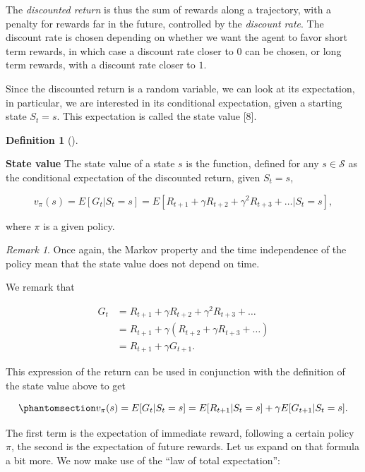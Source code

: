 \documentclass[
  letterpaper,
]{report}
\theoremstyle{definition}
\newtheorem{definition}{Definition}[chapter]
\theoremstyle{plain}
\theoremstyle{definition}
\theoremstyle{remark}
\newtheorem*{remark}{Remark}
\begin{document}
The \emph{discounted return} is thus the sum of rewards along a
trajectory, with a penalty for rewards far in the future, controlled by
the \emph{discount rate}. The discount rate is chosen depending on
whether we want the agent to favor short term rewards, in which case a
discount rate closer to \(0\) can be chosen, or long term rewards, with
a discount rate closer to \(1\).

Since the discounted return is a random variable, we can look at its
expectation, in particular, we are interested in its conditional
expectation, given a starting state \(S_t = s\). This expectation is
called the state value {[}8{]}.

\begin{definition}[]\protect\hypertarget{def-state_value}{}\label{def-state_value}

\textbf{State value} The state value of a state \(s\) is the function,
defined for any \(s\in\mathcal{S}\) as the conditional expectation of
the discounted return, given \(S_t = s\),

\[
v_\pi(s) = E[G_t|S_t = s] = E[R_{t+1} + \gamma R_{t+2} + \gamma^2 R_{t+3} + \dots | S_t = s],
\]

where \(\pi\) is a given policy.

\end{definition}

\begin{remark}
Once again, the Markov property and the time independence of the policy
mean that the state value does not depend on time.
\end{remark}

We remark that

\begin{align}   
G_t &= R_{t+1} + \gamma R_{t+2} + \gamma^2 R_{t+3} + \dots \nonumber\\
&=R_{t+1} + \gamma \left(R_{t+2} + \gamma R_{t+3}+ \dots \right) \nonumber\\
&=R_{t+1} + \gamma G_{t+1}.
\end{align}

This expression of the return can be used in conjunction with the
definition of the state value above to get

\begin{equation}\phantomsection\label{eq-state_value_part1}{
v_\pi(s) = E[G_t|S_t = s]= E[R_{t+1}| S_t = s] + \gamma E[G_{t+1} | S_t = s].
}\end{equation}

The first term is the expectation of immediate reward, following a
certain policy \(\pi\), the second is the expectation of future rewards.
Let us expand on that formula a bit more. We now make use of the ``law
of total expectation'':
\end{document}
